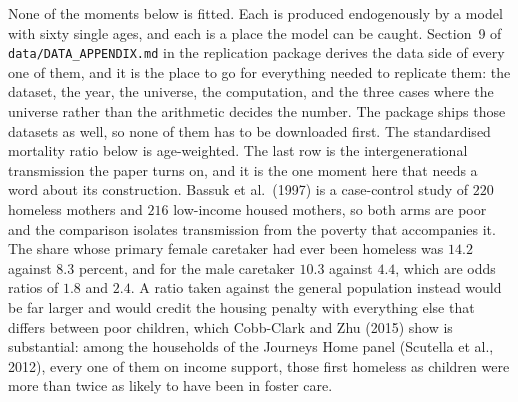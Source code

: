 \documentclass[10pt]{article}
\begin{document}
None of the moments below is fitted. Each is produced endogenously by a model
with sixty single ages, and each is a place the model can be caught.
Section~9 of \texttt{data/}\allowbreak\texttt{DATA\_APPENDIX.md} in the replication
package derives the data side of every one of them, and it is the place to go for
everything needed to replicate them: the dataset, the year, the universe, the
computation, and the three cases where the universe rather than the arithmetic
decides the number. The package ships those datasets as well, so none of them has
to be downloaded first. The standardised mortality ratio below is age-weighted.
The last row is the intergenerational transmission the paper turns on, and it is the
one moment here that needs a word about its construction. Bassuk et al.\ (1997) is a
case-control study of $220$ homeless mothers and $216$ low-income housed mothers, so
both arms are poor and the comparison isolates transmission from the poverty that
accompanies it. The share whose primary female caretaker had ever been homeless was
$14.2$ against $8.3$ percent, and for the male caretaker $10.3$ against $4.4$, which
are odds ratios of $1.8$ and $2.4$. A ratio taken against the general population
instead would be far larger and would credit the housing penalty with everything else
that differs between poor children, which Cobb-Clark and Zhu (2015) show is
substantial: among the households of the Journeys Home panel (Scutella
et al., 2012), every one of them on income support, those first homeless as children
were more than twice as likely to have been in foster care.
\end{document}
